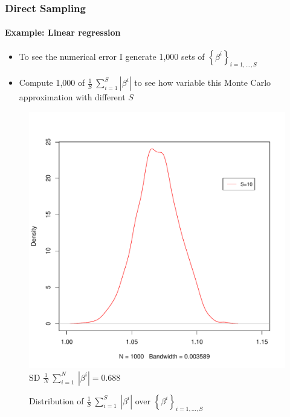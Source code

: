 \documentclass[
  shownotes,
  xcolor={svgnames},
  hyperref={colorlinks,citecolor=DarkBlue,linkcolor=DarkRed,urlcolor=DarkBlue}
  , aspectratio=169]{beamer}
\begin{document}
\begin{frame}[fragile]
\frametitle{Direct Sampling}
\framesubtitle{Example: Linear regression}

\begin{itemize}
\item To see the numerical error I generate 1,000 sets of $\left\{ \beta^{i} \right\}_{i = 1,\ldots,S}$

\item Compute 1,000 of $\frac{1}{S}\ \sum_{i = 1}^{S}\left| \beta^{i} \right|$ to see how variable this Monte Carlo approximation with different $S$

\end{itemize}


  \begin{figure}[H] \centering
  \centering
  \caption{Distribution of $\frac{1}{S}\ \sum_{i = 1}^{S}{\ \left| \beta^{i} \right|}$ over $\left\{ \beta^{i} \right\}_{i = 1,\ldots,S}$}
  \includegraphics[scale=0.2]{figures/n10}
  \\
  \tiny 
  $\text{SD\ }\frac{1}{N}\ \sum_{i = 1}^{N}{\ \left| \beta^{i} \right|} = 0.688$
\end{figure}




\end{frame}
\end{document}
